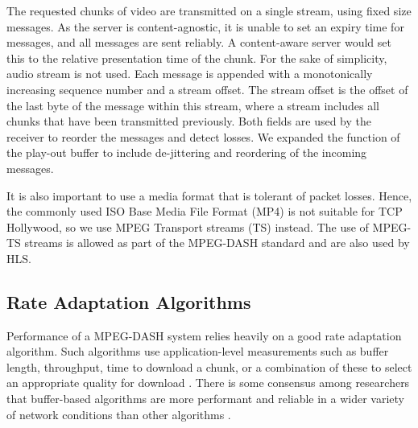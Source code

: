The requested chunks of video are transmitted on a single stream, using fixed size
messages. As the server is content-agnostic, it is unable to set an expiry time for messages, and
all messages are sent reliably. A content-aware server would set this to the relative presentation time of the chunk.
For the sake of simplicity, audio
stream is not used. Each message is appended with a monotonically increasing sequence
number and a stream offset. The stream offset is the offset of the last byte of the
message within this stream, where a stream includes all chunks that have been transmitted
previously. Both fields are used by the receiver to reorder the messages and detect
losses. We expanded the function of the play-out buffer to include de-jittering and
reordering of the incoming messages.

It is also important to use a media format that is tolerant of packet losses. Hence, the
commonly used ISO Base Media File Format (MP4) is not suitable for TCP Hollywood, so we
use MPEG Transport streams (TS) instead. The use of MPEG-TS streams is allowed as part of
the MPEG-DASH standard and are also used by HLS.

\subsection{Rate Adaptation Algorithms}

Performance of a MPEG-DASH system relies heavily on a good rate adaptation algorithm.
Such algorithms use application-level measurements such as buffer length, throughput, time to
download a chunk, or a combination of these to select an appropriate quality for
download \cite{beben2016abma+, spiteri2016bola, li2014probe}. There is some consensus
among researchers that buffer-based algorithms are more performant and reliable in a wider
variety of network conditions than other algorithms 
\cite{huang2015buffer, karagkioules2017comparative}.

